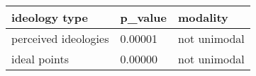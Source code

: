 \begin{table}
\centering
\begin{tabular}[t]{lll}
\toprule
ideology type & p\_value & modality\\
\midrule
perceived ideologies & 0.00001 & not unimodal\\
ideal points & 0.00000 & not unimodal\\
\bottomrule
\end{tabular}
\end{table}
